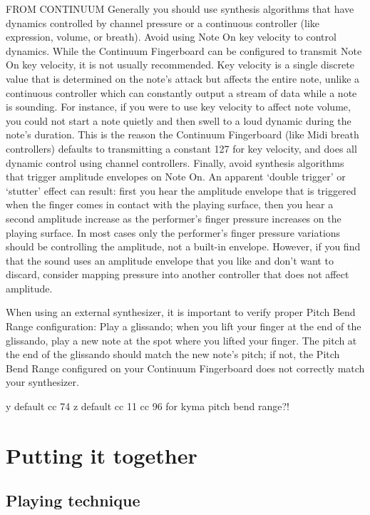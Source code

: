 FROM CONTINUUM 
Generally you should use synthesis algorithms that have dynamics controlled by channel pressure or a continuous controller (like expression, volume, or breath). Avoid using Note On key velocity to control dynamics. While the Continuum Fingerboard can be configured to transmit Note On key velocity, it is not usually recommended. Key velocity is a single discrete value that is determined on the note’s attack but affects the entire note, unlike a continuous controller which can constantly output a stream of data while a note is sounding. For instance, if you were to use key velocity to affect note volume, you could not start a note quietly and then swell to a loud dynamic during the note's duration. This is the reason the Continuum Fingerboard (like Midi breath controllers) defaults to transmitting a constant 127 for key velocity, and does all dynamic control using channel controllers.
Finally, avoid synthesis algorithms that trigger amplitude envelopes on Note On. An apparent ‘double trigger’ or ‘stutter’ effect can result: first you hear the amplitude envelope that is triggered when the finger comes in contact with the playing surface, then you hear a second amplitude increase as the performer’s finger pressure increases on the playing surface. In most cases only the performer's finger pressure variations should be controlling the amplitude, not a built-in envelope. However, if you find that the sound uses an amplitude envelope that you like and don’t want to discard, consider mapping pressure into another controller that does not affect amplitude.

When using an external synthesizer, it is important to verify proper Pitch Bend Range configuration: Play a glissando; when you lift your finger at the end of the glissando, play a new note at the spot where you lifted your finger. The pitch at the end of the glissando should match the new note’s pitch; if not, the Pitch Bend Range configured on your Continuum Fingerboard does not correctly match your synthesizer.

y default cc 74
z default cc 11
cc 96 for kyma pitch bend range?!


\chapter{Putting it together}


\section{Playing technique}

